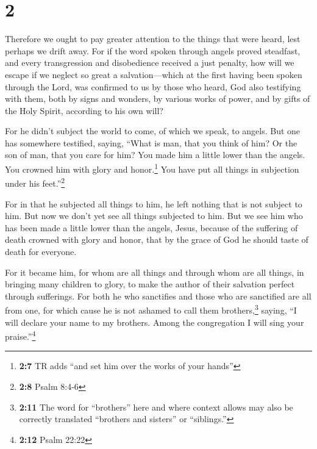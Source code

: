 \hypertarget{section-1}{%
\section{2}\label{section-1}}

 Therefore we ought to pay greater attention to the things
that were heard, lest perhaps we drift away.  For if the
word spoken through angels proved steadfast, and every transgression and
disobedience received a just penalty,  how will we escape
if we neglect so great a salvation---which at the first having been
spoken through the Lord, was confirmed to us by those who heard,
 God also testifying with them, both by signs and wonders,
by various works of power, and by gifts of the Holy Spirit, according to
his own will?

 For he didn't subject the world to come, of which we
speak, to angels.  But one has somewhere testified,
saying, ``What is man, that you think of him? Or the son of man, that
you care for him?  You made him a little lower than the
angels. You crowned him with glory and honor.\footnote{\textbf{2:7} TR
  adds ``and set him over the works of your hands''}  You
have put all things in subjection under his feet.''\footnote{\textbf{2:8}
  Psalm 8:4-6}

For in that he subjected all things to him, he left nothing that is not
subject to him. But now we don't yet see all things subjected to him.
 But we see him who has been made a little lower than the
angels, Jesus, because of the suffering of death crowned with glory and
honor, that by the grace of God he should taste of death for everyone.

 For it became him, for whom are all things and through
whom are all things, in bringing many children to glory, to make the
author of their salvation perfect through sufferings. 
For both he who sanctifies and those who are sanctified are all from
one, for which cause he is not ashamed to call them brothers,\footnote{\textbf{2:11}
  The word for ``brothers'' here and where context allows may also be
  correctly translated ``brothers and sisters'' or ``siblings.''}
 saying, ``I will declare your name to my brothers. Among
the congregation I will sing your praise.''\footnote{\textbf{2:12} Psalm
  22:22}

